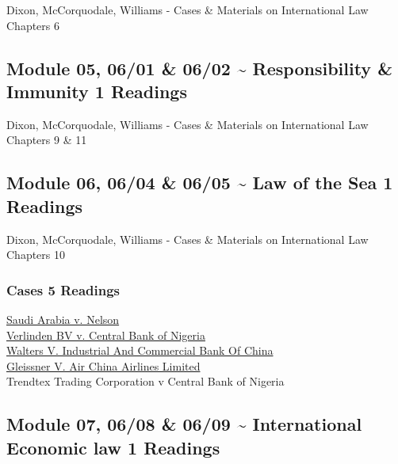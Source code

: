 \documentclass[10pt,]{article}
\begin{document}
Dixon, McCorquodale, Williams - Cases \& Materials on International Law
Chapters 6

\hypertarget{module-05-0601-0602-responsibility-immunity-1-readings}{%
\subsection{Module 05, 06/01 \& 06/02 \textasciitilde{} Responsibility
\& Immunity \textbar{} 1
Readings}\label{module-05-0601-0602-responsibility-immunity-1-readings}}

Dixon, McCorquodale, Williams - Cases \& Materials on International Law
Chapters 9 \& 11

\hypertarget{module-06-0604-0605-law-of-the-sea-1-readings}{%
\subsection{Module 06, 06/04 \& 06/05 \textasciitilde{} Law of the Sea
\textbar{} 1
Readings}\label{module-06-0604-0605-law-of-the-sea-1-readings}}

Dixon, McCorquodale, Williams - Cases \& Materials on International Law
Chapters 10

\hypertarget{cases-5-readings}{%
\subsubsection{Cases \textbar{} 5 Readings}\label{cases-5-readings}}

\href{https://scholar.google.com/scholar_case?case=15997705832480823650}{Saudi
Arabia v. Nelson}\\
\href{https://scholar.google.com/scholar_case?case=12305885770783175808}{Verlinden
BV v. Central Bank of Nigeria}\\
\href{https://www.courtlistener.com/opinion/2502147/walters-v-industrial-and-commercial-bank-of-china/}{Walters
V. Industrial And Commercial Bank Of China}\\
\href{https://scholar.google.com/scholar_case?case=3908553268744923367}{Gleissner
V. Air China Airlines Limited}\\
Trendtex Trading Corporation v Central Bank of Nigeria

\hypertarget{module-07-0608-0609-international-economic-law-1-readings}{%
\subsection{Module 07, 06/08 \& 06/09 \textasciitilde{} International
Economic law \textbar{} 1
Readings}\label{module-07-0608-0609-international-economic-law-1-readings}}
\end{document}
